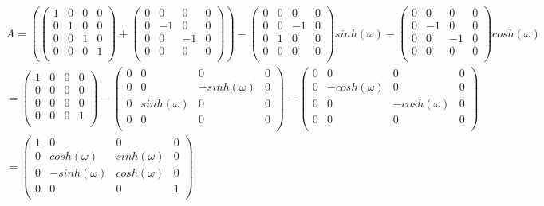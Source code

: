\documentclass[11pt]{article}
\begin{document}
\begin{gather*}
A = 
    \left(
    \begin{pmatrix}
    1 & 0 & 0 & 0 \\
    0 & 1 & 0 & 0 \\
    0 & 0 & 1 & 0 \\
    0 & 0 & 0 & 1 \\
    \end{pmatrix} 
    +
    \begin{pmatrix}
    0 & 0 & 0 & 0 \\
    0 & -1 & 0 & 0 \\
    0 & 0 & -1 & 0 \\
    0 & 0 & 0 & 0 \\
    \end{pmatrix} 
    \right)
    -
    \begin{pmatrix}
    0 & 0 & 0 & 0 \\
    0 & 0 & -1 & 0 \\
    0 & 1 & 0 & 0\\
    0 & 0 & 0 & 0 \\
    \end{pmatrix} 
    sinh(\omega)
    -
    \begin{pmatrix}
    0 & 0 & 0 & 0 \\
    0 & -1 & 0 & 0 \\
    0 & 0 & -1 & 0 \\
    0 & 0 & 0 & 0 \\
    \end{pmatrix} 
    cosh(\omega) \\
    =
    \begin{pmatrix}
    1 & 0 & 0 & 0 \\
    0 & 0 & 0 & 0 \\
    0 & 0 & 0 & 0 \\
    0 & 0 & 0 & 1 \\
    \end{pmatrix} 
    -
    \begin{pmatrix}
    0 & 0 & 0 & 0 \\
    0 & 0 & -sinh(\omega) & 0 \\
    0 & sinh(\omega) & 0 & 0\\
    0 & 0 & 0 & 0 \\
    \end{pmatrix} 
    -
    \begin{pmatrix}
    0 & 0 & 0 & 0 \\
    0 & -cosh(\omega) & 0 & 0 \\
    0 & 0 & -cosh(\omega) & 0 \\
    0 & 0 & 0 & 0 \\
    \end{pmatrix} \\
    =
    \begin{pmatrix}
    1 & 0 & 0 & 0 \\
    0 & cosh(\omega) & sinh(\omega) & 0 \\
    0 & -sinh(\omega) & cosh(\omega) & 0 \\
    0 & 0 & 0 & 1 \\
    \end{pmatrix} 
\end{gather*}
\clearpage
\end{document}

